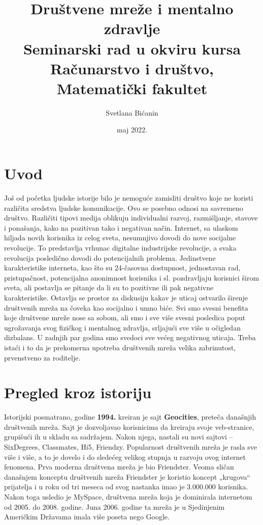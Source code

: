 \documentclass[a4paper]{article}
\begin{document}
	
	\title{Društvene mreže i mentalno zdravlje\\ \small{Seminarski rad u okviru kursa\\Računarstvo i društvo,\\ Matematički fakultet}}
	
	\author{Svetlana Bićanin}
	\date{maj 2022.}
	\maketitle
	
	{
		 		
		\tableofcontents
		
		\newpage
		
		\section{Uvod}
		\label{sec:uvod}
		Još od početka ljudske istorije bilo je nemoguće zamisliti društvo koje ne koristi različita sredstva ljudske komunikacije. Ovo se posebno odnosi na savremeno društvo. Različiti tipovi medija oblikuju individualni razvoj, razmišljanje, stavove i ponašanja, kako na pozitivan tako i negativan način.
		Internet, sa ulaskom hiljada novih korisnika iz celog sveta, nesumnjivo dovodi do nove socijalne revolucije. To predstavlja vrhunac digitalne industrijske revolucije, a svaka revolucija posledično dovodi do potencijalnih problema.
		Jedinstvene karakteristike interneta, kao što su 24-časovna dostupnost, jednostavan rad, pristupačnost, potencijalna anonimnost korisnika i sl. pozdravljaju korisnici širom sveta, ali postavlja se pitanje da li su to pozitivne ili pak negativne karakteristike. Ostavlja se prostor za diskusiju kakav je uticaj ostvarilo širenje društvenih mreža na čoveka kao socijalno i umno biće. Svi smo svesni benefita koje društvene mreže nose sa sobom, ali smo i sve više svesni posledica poput ugrožavanja svog fizičkog i mentalnog zdravlja, srljajući sve više u očigledan dizbalans. U zadnjih par godina smo svedoci sve većeg negativnog uticaja. Treba istaći i to da je prekomerna upotreba društvenih mreža velika zabrinutost, prvenstveno za roditelje.
		
		\section{Pregled kroz istoriju}
		Istorijski posmatrano, godine  \textbf{1994.} kreiran je sajt \textbf{Geocities}, preteča današnjih društvenih mreža. Sajt je dozvoljavao korisnicima da kreiraju svoje veb-stranice, grupišući ih u skladu sa sadržajem. Nakon njega, nastali su novi sajtovi – SixDegrees, Classmates, Hi5, Friendzy. Popularnost društvenih mreža je rasla sve više i više, a to je dovelo i do sledećeg velikog stupnja u razvoju ovog internet fenomena. Prva moderna društvena mreža je bio Friendster. Veoma sličan današnjem konceptu društvenih mreža Friendster je koristio koncept „krugova“ prijatelja i u roku
		od tri meseca od svog nastanka imao je 3.000.000 korisnika. Nakon toga usledio je MySpace, društvena mreža koja je dominirala internetom od 2005. do 2008. godine. Juna 2006. godine ta mreža je u Sjedinjenim Američkim Državama imala više poseta nego Google.
}
\end{document}
